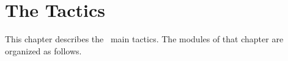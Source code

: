 
\newpage
\section*{The Tactics}

\ocwsection \label{tactics}
This chapter describes the \Coq\ main tactics.
The modules of that chapter are organized as follows.

\bigskip
\begin{center}\end{center}
